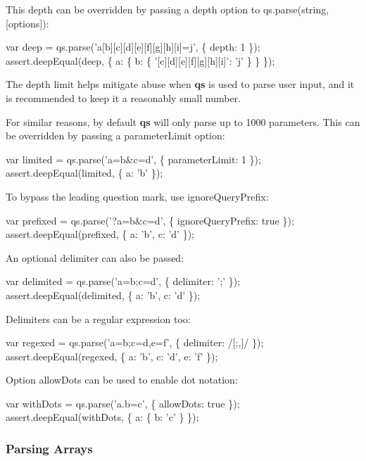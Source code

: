 This depth can be overridden by passing a {\ttfamily depth} option to {\ttfamily qs.\+parse(string, \mbox{[}options\mbox{]})}\+:


\begin{DoxyCode}
var deep = qs.parse('a[b][c][d][e][f][g][h][i]=j', \{ depth: 1 \});
assert.deepEqual(deep, \{ a: \{ b: \{ '[c][d][e][f][g][h][i]': 'j' \} \} \});
\end{DoxyCode}


The depth limit helps mitigate abuse when {\bfseries qs} is used to parse user input, and it is recommended to keep it a reasonably small number.

For similar reasons, by default {\bfseries qs} will only parse up to 1000 parameters. This can be overridden by passing a {\ttfamily parameter\+Limit} option\+:


\begin{DoxyCode}
var limited = qs.parse('a=b&c=d', \{ parameterLimit: 1 \});
assert.deepEqual(limited, \{ a: 'b' \});
\end{DoxyCode}


To bypass the leading question mark, use {\ttfamily ignore\+Query\+Prefix}\+:


\begin{DoxyCode}
var prefixed = qs.parse('?a=b&c=d', \{ ignoreQueryPrefix: true \});
assert.deepEqual(prefixed, \{ a: 'b', c: 'd' \});
\end{DoxyCode}


An optional delimiter can also be passed\+:


\begin{DoxyCode}
var delimited = qs.parse('a=b;c=d', \{ delimiter: ';' \});
assert.deepEqual(delimited, \{ a: 'b', c: 'd' \});
\end{DoxyCode}


Delimiters can be a regular expression too\+:


\begin{DoxyCode}
var regexed = qs.parse('a=b;c=d,e=f', \{ delimiter: /[;,]/ \});
assert.deepEqual(regexed, \{ a: 'b', c: 'd', e: 'f' \});
\end{DoxyCode}


Option {\ttfamily allow\+Dots} can be used to enable dot notation\+:


\begin{DoxyCode}
var withDots = qs.parse('a.b=c', \{ allowDots: true \});
assert.deepEqual(withDots, \{ a: \{ b: 'c' \} \});
\end{DoxyCode}


\subsubsection*{Parsing Arrays}

